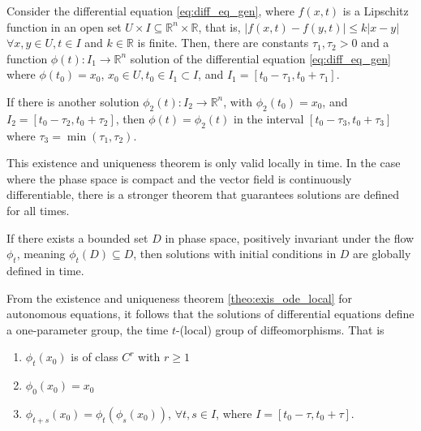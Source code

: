 \begin{theorem}
    Consider the differential equation \ref{eq:diff_eq_gen}, where $f(x,t)$ is a Lipschitz function in an open set $U \times I \subseteq \mathbb{R}^n \times \mathbb{R}$,
    that is, $|f(x,t) - f(y,t)| \leq k|x-y|$ $ \forall x,y \in U, t \in I$ and $k \in \mathbb{R}$ is finite. Then, there are constants $\tau_1, \tau_2 > 0$ and a function
    $\phi(t): I_1 \rightarrow \mathbb{R}^n$ solution of the differential equation \ref{eq:diff_eq_gen} where $\phi(t_0) = x_0$, $x_0 \in U, t_0 \in I_1 \subset I$, 
    and $I_1 = \left[t_0-\tau_1, t_0+\tau_1\right]$.
    
    If there is another solution $\phi_2(t): I_2 \rightarrow \mathbb{R}^n$, with $\phi_2(t_0)=x_0$, and $I_2 = \left[ t_0-\tau_2, t_0+\tau_2 \right]$, then 
    $\phi(t) = \phi_2(t)$ in the interval $\left[t_0-\tau_3, t_0+\tau_3\right]$ where $\tau_3 = \min(\tau_1, \tau_2)$.
    
    \label{theo:exis_ode_local}
\end{theorem}

This existence and uniqueness theorem is only valid locally in time. In the case where the phase space is compact and the vector field is continuously differentiable, there 
is a stronger theorem that guarantees solutions are defined for all times.

\begin{theorem}
    If there exists a bounded set $D$ in phase space, positively invariant under the flow $\phi_t$, meaning $\phi_t(D) \subseteq D$, then solutions with initial conditions
    in $D$ are globally defined in time.
    \label{theo:exis_ode_global}
\end{theorem}

From the existence and uniqueness theorem \ref{theo:exis_ode_local} for autonomous equations, it follows that the solutions of differential equations define a one-parameter
group, the time $t$-(local) group of diffeomorphisms. That is 

\begin{enumerate}
    \item $\phi_t(x_0)$ is of class $C^r$ with $r \geq 1$
    \item $\phi_0(x_0) = x_0$
    \item $\phi_{t+s}(x_0) = \phi_{t}(\phi_s(x_0))$, $\forall t, s \in I$, where $I = \left[t_0-\tau, t_0+\tau\right]$.
\end{enumerate}

